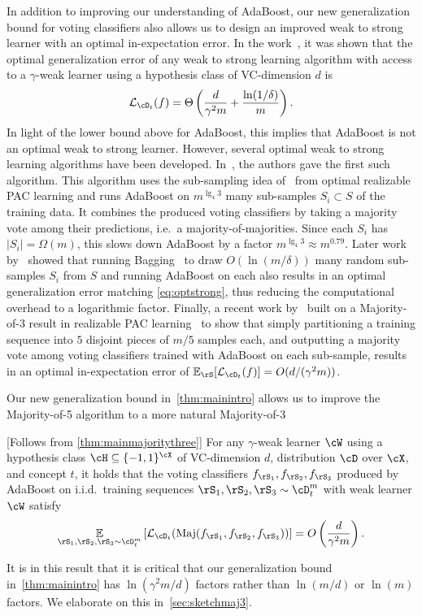  In addition to improving our understanding of AdaBoost, our new
 generalization bound for voting classifiers also allows us to design
 an improved weak to strong learner with an optimal in-expectation error. In the
 work~\cite{larsen2022optimalweakstronglearning}, it was shown that the optimal generalization
 error of any weak to strong learning algorithm with access to a
 $\gamma$-weak learner using a hypothesis class of VC-dimension $d$ is
 \begin{align}
   \ls_{\cD_t}(f) = \Theta\left(\frac{d}{\gamma^2m} + \frac{\ln(1/\delta)}{m}\right).\label{eq:optstrong}
 \end{align}
 In light of the lower bound above for AdaBoost, this implies that
 AdaBoost is not an optimal weak to strong learner. However, several optimal weak to strong
 learning algorithms have been developed. In~\cite{larsen2022optimalweakstronglearning}, the authors gave
 the first such algorithm. This algorithm uses the sub-sampling idea
 of~\cite{Hannekeoptimal} from optimal realizable PAC learning and runs AdaBoost on
 $m^{\lg_4 3}$ many sub-samples $S_i \subset S$ of the training
 data. It combines the produced voting classifiers by taking a
 majority vote among their predictions, i.e.\ a majority-of-majorities. Since each $S_i$ has $|S_i|= \Omega(m)$, this slows down
 AdaBoost by a factor $m^{\lg_4 3} \approx m^{0.79}$. Later work
 by~\cite{baggingoptimal} showed that running Bagging~\cite{Breiman1996BaggingP} to draw
 $O(\ln(m/\delta))$ many random sub-samples
 $S_i$ from $S$ and running AdaBoost on each also results in an
 optimal generalization error matching \cref{eq:optstrong}, thus
 reducing the computational overhead to a logarithmic factor. Finally,
 a recent work by~\cite{manyfacesofoptimalweaktostronglearning} built on a Majority-of-3 result in
 realizable PAC learning~\cite{majorityofthree} to show that simply partitioning a training
 sequence into $5$ disjoint pieces of $m/5$ samples each, and
 outputting a majority vote among voting classifiers trained with
 AdaBoost on each sub-sample, results in an optimal in-expectation
 error of $\e_{\rS}[\ls_{\cD_t}(f)] = O(d/(\gamma^2 m))$.

 Our new generalization bound in~\cref{thm:mainintro} allows us to
 improve the Majority-of-5 algorithm to a more natural Majority-of-3
 \begin{corollary}
 \label{cor:maj3intro}[Follows from \cref{thm:mainmajoritythree}]
For any $\gamma$-weak learner $\cW$ using a hypothesis class $ \cH \subseteq \{  -1,1\}^{\cX}$ of VC-dimension
$ d $, distribution $ \cD $ over $ \cX$, and concept $t$, it holds that the voting
classifiers $f_{\rS_1},f_{\rS_2},f_{\rS_3}$ produced by AdaBoost on
i.i.d.\ training sequences $\rS_1,\rS_2,\rS_3 \sim \cD_t^m$ with
weak learner $\cW$ satisfy
    \begin{align*}
    \e_{\rS_{1},\rS_{2},\rS_{3}\sim \cD_t^{m}}\left[\ls_{\cD_t}(\maj(f_{\rS_{1}},f_{\rS_{2}},f_{\rS_{3}}))\right] =O\left(\frac{d}{\gamma^{2}m}\right).
    \end{align*}
  \end{corollary}
It is in this result that it is critical that our generalization bound
in~\cref{thm:mainintro} has $\ln(\gamma^2 m/d)$ factors rather than
$\ln(m/d)$ or $\ln(m)$ factors. We elaborate on this in~\cref{sec:sketchmaj3}.
